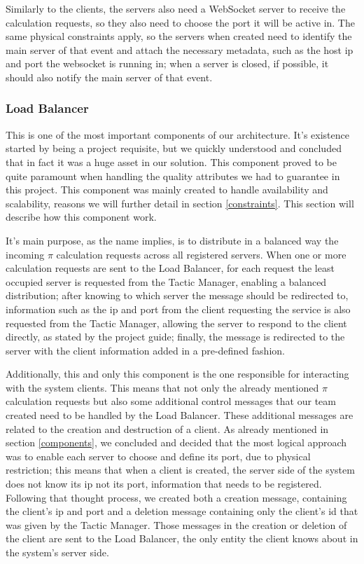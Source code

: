 \documentclass[12pt]{article}
\begin{document}
Similarly to the clients, the servers also need a WebSocket server to receive the calculation requests, so they also need to choose the port it will be active in. The same physical constraints apply, so the servers when created need to identify the main server of that event and attach the necessary metadata, such as the host ip and port the websocket is running in; when a server is closed, if possible, it should also notify the main server of that event.

\subsubsection{Load Balancer} \label{lb}
This is one of the most important components of our architecture. It's existence started by being a project requisite, but we quickly understood and concluded that in fact it was a huge asset in our solution. This component proved to be quite paramount when handling the quality attributes we had to guarantee in this project. This component was mainly created to handle availability and scalability, reasons we will further detail in section \ref{constraints}. This section will describe how this component work.

It's main purpose, as the name implies, is to distribute in a balanced way the incoming $\pi$ calculation requests across all registered servers. When one or more calculation requests are sent to the Load Balancer, for each request the least occupied server is requested from the Tactic Manager, enabling a balanced distribution; after knowing to which server the message should be redirected to, information such as the ip and port from the client requesting the service is also requested from the Tactic Manager, allowing the server to respond to the client directly, as stated by the project guide; finally, the message is redirected to the server with the client information added in a pre-defined fashion.

Additionally, this and only this component is the one responsible for interacting with the system clients. This means that not only the already mentioned $\pi$ calculation requests but also some additional control messages that our team created need to be handled by the Load Balancer. These additional messages are related to the creation and destruction of a client. As already mentioned in section \ref{components}, we concluded and decided that the most logical approach was to enable each server to choose and define its port, due to physical restriction; this means that when a client is created, the server side of the system does not know its ip not its port, information that needs to be registered. Following that thought process, we created both a creation message, containing the client's ip and port and a deletion message containing only the client's id that was given by the Tactic Manager. Those messages in the creation or deletion of the client are sent to the Load Balancer, the only entity the client knows about in the system's server side.
\end{document}

